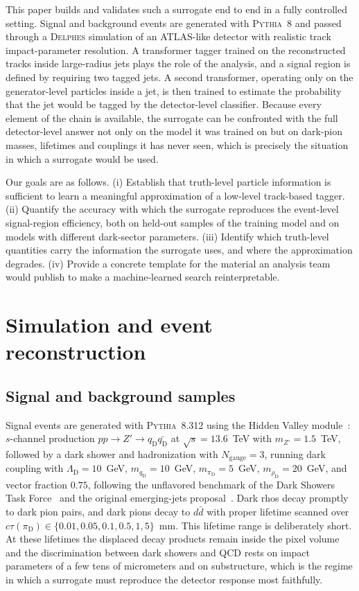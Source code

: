 \documentclass[a4paper,11pt]{article}
\newcommand{\ctau}{c\tau}
\newcommand{\pid}{\pi_{\mathrm{D}}}
\newcommand{\rhod}{\rho_{\mathrm{D}}}
\newcommand{\qD}{q_{\mathrm{D}}}
\newcommand{\mpid}{m_{\pid}}
\begin{document}
This paper builds and validates such a surrogate end to end in a
fully controlled setting. Signal and background events are generated
with \textsc{Pythia}~8 and passed through a \textsc{Delphes} simulation
of an ATLAS-like detector with realistic track impact-parameter
resolution. A transformer tagger trained on the reconstructed tracks
inside large-radius jets plays the role of the analysis, and a signal
region is defined by requiring two tagged jets. A second transformer,
operating only on the generator-level particles inside a jet, is then
trained to estimate the probability that the jet would be tagged by
the detector-level classifier. Because every element of the chain is
available, the surrogate can be confronted with the full
detector-level answer not only on the model it was trained on but on
dark-pion masses, lifetimes and couplings it has never seen, which is
precisely the situation in which a surrogate would be used.

Our goals are as follows.
(i) Establish that truth-level particle information is sufficient to
learn a meaningful approximation of a low-level track-based tagger.
(ii) Quantify the accuracy with which the surrogate reproduces the
event-level signal-region efficiency, both on held-out samples of the
training model and on models with different dark-sector parameters.
(iii) Identify which truth-level quantities carry the information the
surrogate uses, and where the approximation degrades.
(iv) Provide a concrete template for the material an analysis team
would publish to make a machine-learned search reinterpretable.

\section{Simulation and event reconstruction}
\label{sec:simulation}

\subsection{Signal and background samples}

Signal events are generated with \textsc{Pythia}~8.312
\cite{Bierlich:2022pfr} using the Hidden Valley
module~\cite{Carloni:2010tw}: $s$-channel production
$pp \to Z' \to \qD\bar{\qD}$ at $\sqrt{s} = 13.6$~TeV with
$m_{Z'} = 1.5$~TeV, followed by a dark shower and hadronization with
$N_{\mathrm{gauge}} = 3$, running dark coupling with
$\Lambda_{\mathrm{D}} = 10$~GeV, $m_{\qD} = 10$~GeV,
$\mpid = 5$~GeV, $m_{\rhod} = 20$~GeV, and vector fraction $0.75$,
following the unflavored benchmark of the Dark Showers Task
Force~\cite{Albouy:2022cin} and the original emerging-jets
proposal~\cite{Schwaller:2015gea}. Dark rhos decay promptly to dark
pion pairs, and dark pions decay to $d\bar d$ with proper lifetime
scanned over $\ctau(\pid) \in \{0.01, 0.05, 0.1, 0.5, 1, 5\}$~mm. This lifetime range
is deliberately short. At these lifetimes the displaced decay products
remain inside the pixel volume and the discrimination between dark
showers and QCD rests on impact parameters of a few tens of
micrometers and on substructure, which is the regime in which a
surrogate must reproduce the detector response most faithfully.
\end{document}
